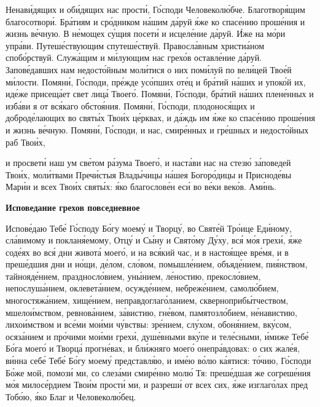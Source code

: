    Ненави́дящих и оби́дящих нас прости́, Го́споди Человеколю́бче.
Благотворя́щим благосотвори́. Бра́тиям и сро́дником на́шим да́руй я́же ко
спасе́нию проше́ния и жизнь ве́чную. В не́мощех су́щия посети́ и исцеле́ние
да́руй. И́же на мо́ри упра́ви. Путеше́ствующим спутеше́ствуй. Правосла́вным
христиа́ном спобо́рствуй. Служа́щим и ми́лующим нас грехо́в оставле́ние
да́руй. Запове́давших нам недосто́йным моли́тися о них поми́луй по вели́цей
Твое́й ми́лости. Помяни́, Го́споди, пре́жде усо́пших оте́ц и бра́тий на́ших и
упоко́й их, иде́же присеща́ет свет лица́ Твоего́. Помяни́, Го́споди,
бра́тий на́ших плене́нных и изба́ви я от вся́каго обстоя́ния. Помяни́,
Го́споди, плодонося́щих и доброде́лающих во святы́х Твои́х це́рквах,
и да́ждь им я́же ко спасе́нию проше́ния и жизнь ве́чную. Помяни́,
Го́споди, и нас, смире́нных и гре́шных и недосто́йных раб Твои́х,

и просвети́ наш ум све́том ра́зума Твоего́, и наста́ви нас на стезю́
за́поведей Твои́х, моли́твами Пречи́стыя Влады́чицы на́шея Богоро́дицы и
Присноде́вы Мари́и и всех Твои́х святы́х: я́ко благослове́н еси́ во ве́ки веко́в.
Ами́нь.



 

\bfseries Исповедание грехов повседневное\normalfont{}


   Испове́даю Тебе́ Го́споду Бо́гу моему́ и Творцу́, во Святе́й Тро́ице
Еди́ному, сла́вимому и покланя́емому, Отцу́ и Сы́ну и Свято́му Ду́ху, вся́
мо́я грехи́, я́же соде́ях во вся́ дни живота́ моего́, и на вся́кий час,
и в настоя́щее вре́мя, и в преше́дшия дни и но́щи, де́лом, сло́вом,
помышле́нием, объяде́нием, пия́нством, тайнояде́нием, праздносло́вием,
уны́нием, ле́ностию, прекосло́вием, непослуша́нием, оклевета́нием,
осужде́нием, небреже́нием, самолю́бием, многостяжа́нием, хище́нием,
неправдоглаго́ланием, скверноприбы́тчеством, мшелои́мством, ревнова́нием,
за́вистию, гне́вом, памятозло́бием, не́навистию, лихои́мством и все́ми
мои́ми чу́вствы: зре́нием, слу́хом, обоня́нием, вку́сом, осяза́нием и
про́чими мои́ми грехи́, душе́вными вку́пе и теле́сными, и́миже Тебе́
Бо́га моего́ и Творца́ прогне́вах, и бли́жняго моего́ онепра́вдовах: о
сих жале́я, ви́нна себе́ Тебе́ Бо́гу моему́ представля́ю, и име́ю во́лю
ка́ятися: то́чию, Го́споди Бо́же мой, помози́ ми, со слеза́ми смире́нно
молю́ Тя: преше́дшая же согреше́ния мо́я милосе́рдием Твои́м прости́
ми, и разреши́ от всех сих, я́же изглаго́лах пред Тобо́ю, я́ко Благ и
Человеколю́бец.



 

